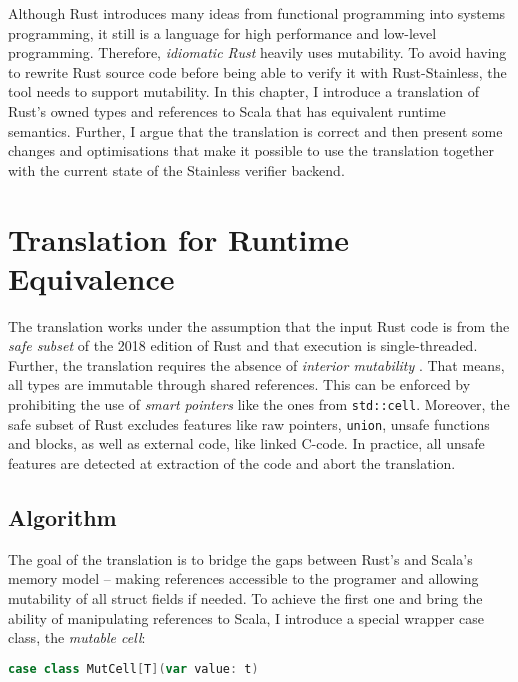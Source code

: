 Although Rust introduces many ideas from functional programming into systems
programming, it still is a language for high performance and low-level
programming. Therefore, \emph{idiomatic Rust} heavily uses mutability. To avoid
having to rewrite Rust source code before being able to verify it with
Rust-Stainless, the tool needs to support mutability. In this chapter, I
introduce a translation of Rust's owned types and references to Scala that has
equivalent runtime semantics. Further, I argue that the translation is correct
and then present some changes and optimisations that make it possible to use the
translation together with the current state of the Stainless verifier backend.

\section{Translation for Runtime Equivalence}
\label{sec:translation}

The translation works under the assumption that the input Rust code is from the
\emph{safe subset} \cite[section ``Unsafety'']{rustref} of the 2018 edition of
Rust and that execution is single-threaded. Further, the translation requires
the absence of \emph{interior mutability} \cite[section ``Interior
Mutability'']{rustref}. That means, all types are immutable through shared
references. This can be enforced by prohibiting the use of \emph{smart pointers}
like the ones from \passthrough{\lstinline!std::cell!}. Moreover, the safe
subset of Rust excludes features like raw pointers,
\passthrough{\lstinline!union!}, unsafe functions and blocks, as well as
external code, like linked C-code. In practice, all unsafe features are detected
at extraction of the code and abort the translation.


\subsection{Algorithm}

The goal of the translation is to bridge the gaps between Rust's and Scala's
memory model -- making references accessible to the programer and allowing
mutability of all struct fields if needed. To achieve the first one and bring
the ability of manipulating references to Scala, I introduce a special wrapper
case class, the \emph{mutable cell}:

\begin{lstlisting}[language=Scala, style=short]
case class MutCell[T](var value: t)
\end{lstlisting}

